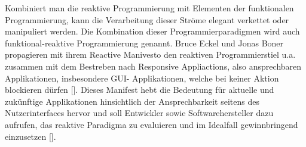 \documentclass[12pt,oneside,a4paper,bibtotoc,liststotoc]{scrreprt}
\begin{document}
Kombiniert man die reaktive Programmierung mit Elementen der funktionalen Programmierung, kann die Verarbeitung dieser Ströme elegant verkettet oder manipuliert werden. Die Kombination dieser Programmierparadigmen wird auch funktional-reaktive Programmierung genannt.
\newline
\newline
\newline
Bruce Eckel und Jonas Boner propagieren mit ihrem Reactive Manivesto den reaktiven Programmierstiel u.a. zusammen mit dem Bestreben nach \glqq Responsive Appliactions\grqq , also ansprechbaren Applikationen, insbesondere GUI- Applikationen, welche bei keiner Aktion blockieren dürfen [\cite{heiseReactiveManifesto}]. Dieses Manifest hebt die Bedeutung für aktuelle und zukünftige Applikationen hinsichtlich der Ansprechbarkeit seitens des Nutzerinterfaces hervor und soll Entwickler sowie Softwarehersteller dazu aufrufen, das reaktive Paradigma zu evaluieren und im Idealfall gewinnbringend einzusetzen [\citet{reactiveManifesto}].
\end{document}
